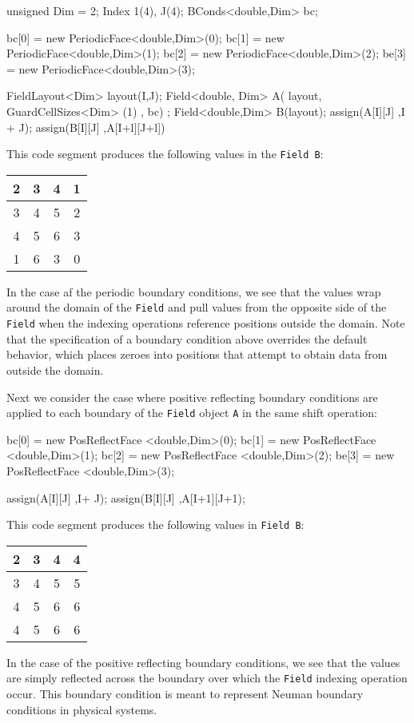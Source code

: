 \begin{smallcode}
unsigned Dim = 2; 
Index 1(4), J(4); 
BConds<double,Dim> bc;
 
bc[0] = new PeriodicFace<double,Dim>(0); 
bc[1] = new PeriodicFace<double,Dim>(1); 
bc[2] = new PeriodicFace<double,Dim>(2);
be[3] = new PeriodicFace<double,Dim>(3);

FieldLayout<Dim> layout(I,J); 
Field<double, Dim> A( layout, GuardCellSizes<Dim> (1) , bc) ; 
Field<double,Dim> B(layout); 
assign(A[I][J] ,I + J); 
assign(B[I][J] ,A[I+l][J+l]) 
\end{smallcode}
This code segment produces the following values in the \texttt{Field B}: 
\begin{center}
        \begin{tabular}{|c|c|c|c|}
        \hline
        2 & 3 & 4 & 1 \\        \hline
        3 & 4 & 5 & 2 \\        \hline
        4 & 5 & 6 & 3 \\        \hline
        1 & 6 & 3 & 0 \\        \hline	
        \end{tabular}
   \label{tbl:t2}
   \end{center}
In the case af the periodic boundary conditions, we see that the values wrap around the domain of the \texttt{Field} and pull values from the opposite side of the \texttt{Field} when the 
indexing operations reference positions outside the domain. Note that the specification of a boundary condition above overrides the default behavior, which places zeroes into
positions that attempt to obtain data from outside the domain. 

Next we consider the case where positive reflecting boundary conditions are applied to each 
boundary of the  \texttt{Field} object  \texttt{A} in the same shift operation: 
\begin{smallcode}
bc[0] = new PosReflectFace <double,Dim>(0); 
bc[1] = new PosReflectFace <double,Dim>(1); 
bc[2] = new PosReflectFace <double,Dim>(2);
be[3] = new PosReflectFace <double,Dim>(3);

assign(A[I][J] ,I+ J); 
assign(B[I][J] ,A[I+1][J+1);
\end{smallcode}
This code segment produces the following values in \texttt{Field B}: 
\begin{center}
        \begin{tabular}{|c|c|c|c|}
        \hline
        2 & 3 & 4 & 4 \\        \hline
        3 & 4 & 5 & 5 \\        \hline
        4 & 5 & 6 & 6 \\        \hline
         4 & 5 & 6 & 6 \\        \hline	
        \end{tabular}
   \label{tbl:t3}
\end{center}
In the case of the positive reflecting boundary conditions, we see that the values are simply reflected across the boundary over which the \texttt{Field} indexing operation occur. 
This boundary condition is meant to represent Neuman boundary conditions in physical systems.
 

